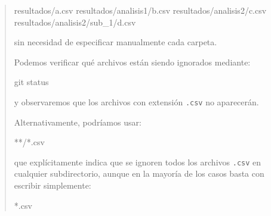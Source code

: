 \documentclass[
  spanish,
  12pt,
  letterpaper,
  DIV=11,
  numbers=noendperiod]{scrreprt}
\newenvironment{Shaded}{\begin{snugshade}}{\end{snugshade}}
\newcommand{\FunctionTok}[1]{\textcolor[rgb]{0.28,0.35,0.67}{#1}}
\newcommand{\NormalTok}[1]{\textcolor[rgb]{0.00,0.23,0.31}{#1}}
\begin{document}
\begin{tcolorbox}
\begin{quote}
\begin{Shaded}
\begin{Highlighting}[]
\NormalTok{resultados/a.csv}
\NormalTok{resultados/analisis1/b.csv}
\NormalTok{resultados/analisis2/c.csv}
\NormalTok{resultados/analisis2/sub\_1/d.csv}
\end{Highlighting}
\end{Shaded}

sin necesidad de especificar manualmente cada carpeta.

Podemos verificar qué archivos están siendo ignorados mediante:

\begin{Shaded}
\begin{Highlighting}[]
\FunctionTok{git}\NormalTok{ status}
\end{Highlighting}
\end{Shaded}

y observaremos que los archivos con extensión \texttt{.csv} no
aparecerán.

Alternativamente, podríamos usar:

\begin{Shaded}
\begin{Highlighting}[]
\NormalTok{**/*.csv}
\end{Highlighting}
\end{Shaded}

que explícitamente indica que se ignoren todos los archivos
\texttt{.csv} en cualquier subdirectorio, aunque en la mayoría de los
casos basta con escribir simplemente:

\begin{Shaded}
\begin{Highlighting}[]
\NormalTok{*.csv}
\end{Highlighting}
\end{Shaded}
\end{quote}

\end{tcolorbox}
\end{document}
